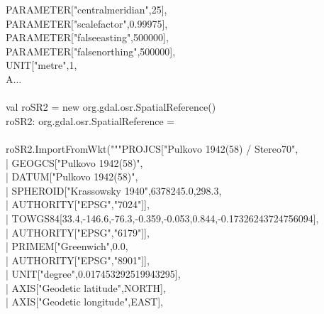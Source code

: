 \documentclass {article}
\begin{document}
\hspace*{2mm} PARAMETER["central\underline{\space}meridian",25],\\
\hspace*{2mm} PARAMETER["scale\underline{\space}factor",0.99975],\\
\hspace*{2mm} PARAMETER["false\underline{\space}easting",500000],\\
\hspace*{2mm} PARAMETER["false\underline{\space}northing",500000],\\
\hspace*{2mm} UNIT["metre",1,\\
\hspace*{2mm} A...\\
\\
val roSR2 = new org.gdal.osr.SpatialReference() \\
roSR2: org.gdal.osr.SpatialReference = \\
\\
roSR2.ImportFromWkt("""PROJCS["Pulkovo 1942(58) / Stereo70",\\
 |\hspace*{2mm} GEOGCS["Pulkovo 1942(58)",\\
 |\hspace*{4mm} DATUM["Pulkovo 1942(58)",\\
 |\hspace*{6mm} SPHEROID["Krassowsky 1940",6378245.0,298.3,\\
 |\hspace*{8mm} AUTHORITY["EPSG","7024"]],\\
 |\hspace*{6mm} TOWGS84[33.4,-146.6,-76.3,-0.359,-0.053,0.844,-0.17326243724756094],\\
 |\hspace*{6mm} AUTHORITY["EPSG","6179"]],\\
 |\hspace*{4mm} PRIMEM["Greenwich",0.0,\\
 |\hspace*{6mm} AUTHORITY["EPSG","8901"]],\\
 |\hspace*{4mm} UNIT["degree",0.017453292519943295],\\
 |\hspace*{4mm} AXIS["Geodetic latitude",NORTH],\\
 |\hspace*{4mm} AXIS["Geodetic longitude",EAST],\\
\end{document}
